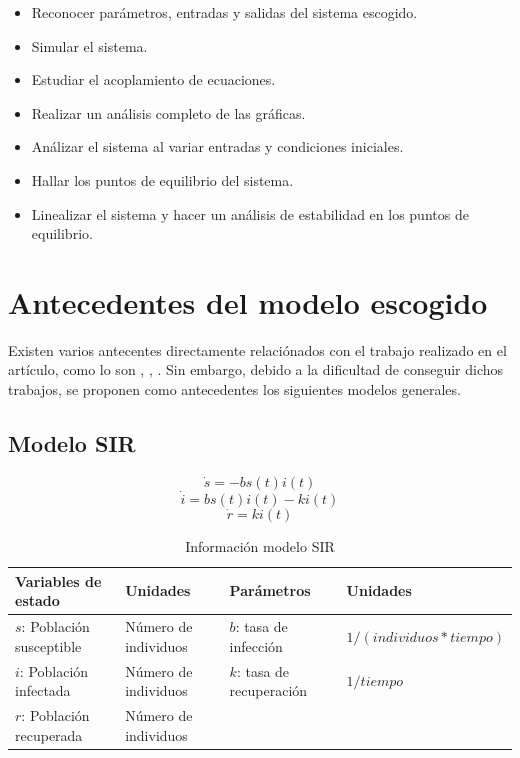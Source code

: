 \documentclass{article}
\begin{document}
\begin{itemize}
    \item Reconocer parámetros, entradas y salidas del sistema escogido.
    \item Simular el sistema.
    \item Estudiar el acoplamiento de ecuaciones.
    \item Realizar un análisis completo de las gráficas.
    \item Análizar el sistema al variar entradas y condiciones iniciales.
    \item Hallar los puntos de equilibrio del sistema.
    \item Linealizar el sistema y hacer un análisis de estabilidad en los puntos de equilibrio.
\end{itemize}

\section{Antecedentes del modelo escogido}

Existen varios antecentes directamente relaciónados con el trabajo realizado en el
artículo, como lo son \cite{ieee1}, \cite{ieee2}, \cite{ieee3}. Sin embargo,
debido a la dificultad de conseguir dichos trabajos, se proponen como
antecedentes los siguientes modelos generales.

\newpage

    \subsection{Modelo SIR}

        \Large
        $$\dot{s} = -b s(t) i(t)$$
        $$\dot{i} = b s(t) i(t) - k i(t)$$
        $$\dot{r} = k i(t)$$
        \normalsize

        \vspace{0.5cm}

        \begin{table}[H]
        \begin{tabular}[t]{|p{4cm} p{3.5cm}|p{4cm} p{4cm}|}
            \hline
            \textbf{Variables de estado} & \textbf{Unidades} & \textbf{Parámetros} & \textbf{Unidades} \\
            \hline
            $s$: Población susceptible & Número de individuos & $b$: tasa de infección    & $1/(individuos * tiempo)$\\
            $i$: Población infectada   & Número de individuos & $k$: tasa de recuperación & $1/tiempo$\\
            $r$: Población recuperada  & Número de individuos &  & \\
            \hline
        \end{tabular}
        \caption{Información modelo SIR \cite{sir}}
        \label{table:sir}
        \end{table}
\end{document}
